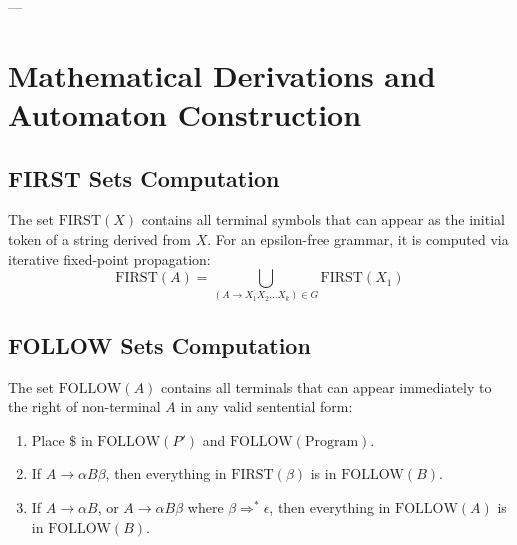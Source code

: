 \documentclass[11pt,a4paper]{article}
\begin{document}
---

\section{Mathematical Derivations and Automaton Construction}

\subsection{FIRST Sets Computation}
The set $\text{FIRST}(X)$ contains all terminal symbols that can appear as the initial token of a string derived from $X$. For an epsilon-free grammar, it is computed via iterative fixed-point propagation:
\begin{equation}
\text{FIRST}(A) = \bigcup_{(A \to X_1 X_2 \dots X_k) \in G} \text{FIRST}(X_1)
\end{equation}

\subsection{FOLLOW Sets Computation}
The set $\text{FOLLOW}(A)$ contains all terminals that can appear immediately to the right of non-terminal $A$ in any valid sentential form:
\begin{enumerate}
    \item Place $\$$ in $\text{FOLLOW}(P')$ and $\text{FOLLOW}(\text{Program})$.
    \item If $A \to \alpha B \beta$, then everything in $\text{FIRST}(\beta)$ is in $\text{FOLLOW}(B)$.
    \item If $A \to \alpha B$, or $A \to \alpha B \beta$ where $\beta \Rightarrow^* \epsilon$, then everything in $\text{FOLLOW}(A)$ is in $\text{FOLLOW}(B)$.
\end{enumerate}
\end{document}
